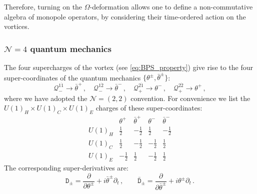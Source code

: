 \documentclass[12pt,a4paper]{article}
\renewcommand{\(}{\left(}
\renewcommand{\)}{\right)}
\renewcommand{\(}{\left(}
\renewcommand{\)}{\right)}
\begin{document}
Therefore, turning on the $\Omega$-deformation allows one to define a non-commutative algebra of monopole operators, by considering their time-ordered action on the vortices. 

\subsubsection{\texorpdfstring{$\mathcal{N}=4$ quantum mechanics}{N=4 quantum mechanics}}


The four supercharges of the vortex (see \eqref{eq:BPS_property}) give rise to the four super-coordinates of the quantum mechanics $\{\theta^\pm,\bar{\theta}^\pm\}$:
\begin{equation}
\mathcal{Q}^{1\dot{1}}_{-}\rightarrow \bar{\theta}^+\,,\quad
\mathcal{Q}^{1\dot{2}}_-\rightarrow\bar{\theta}^-\,,\quad
\mathcal{Q}^{2\dot{1}}_+\rightarrow\theta^-\,,\quad
\mathcal{Q}^{2\dot{2}}_+\rightarrow \theta^+\,,
\end{equation}
where we have adopted the $\mathcal{N}=(2,2)$ convention. 
For convenience we list the $ U(1)_H \times U(1)_C\times U(1)_E$ charges of these super-coordinates:
\begin{equation}
\begin{array}{c|cccc}
&\theta^+ &\bar{\theta}^+&\theta^- &\bar{\theta}^-\\
\hline  
U(1)_H&\frac{1}{2}&-\frac{1}{2}&\frac{1}{2}&-\frac{1}{2}\\
U(1)_C&\frac{1}{2}&-\frac{1}{2}&-\frac{1}{2}&\frac{1}{2}\\
U(1)_E &-\frac{1}{2}&\frac{1}{2}&-\frac{1}{2}&\frac{1}{2}
\end{array}
\end{equation}
The corresponding super-derivatives are:
\begin{equation}
\mathtt{D}_\pm=\frac{\partial}{\partial\theta^\pm}+i\bar{\theta}^\pm \partial_t\,,\qquad \bar{\mathtt{D}}_\pm=\frac{\partial}{\partial\bar{\theta}^\pm}+i\theta^\pm\partial_t\,.
\end{equation}
\end{document}
